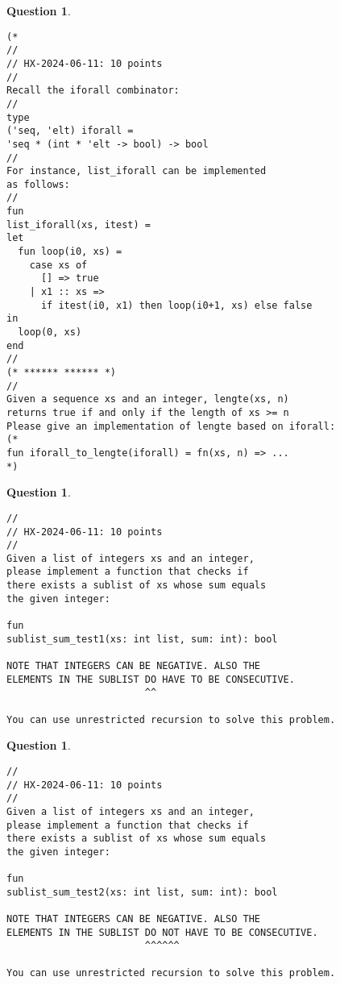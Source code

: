 \documentclass[12pt,fullpage]{article}
\newtheorem{question}[lemma]{Question}
\begin{document}
\vfill\newpage

\begin{question}~~
\begin{verbatim}
(*
//
// HX-2024-06-11: 10 points
//
Recall the iforall combinator:
//
type
('seq, 'elt) iforall =
'seq * (int * 'elt -> bool) -> bool
//
For instance, list_iforall can be implemented
as follows:
//
fun
list_iforall(xs, itest) =
let
  fun loop(i0, xs) =
    case xs of
      [] => true
    | x1 :: xs =>
      if itest(i0, x1) then loop(i0+1, xs) else false
in
  loop(0, xs)
end
//
(* ****** ****** *)
//
Given a sequence xs and an integer, lengte(xs, n)
returns true if and only if the length of xs >= n
Please give an implementation of lengte based on iforall:
(*
fun iforall_to_lengte(iforall) = fn(xs, n) => ...
*)
\end{verbatim}
\end{question}

\vfill\newpage

\begin{question}~~
\begin{verbatim}
//
// HX-2024-06-11: 10 points
//
Given a list of integers xs and an integer,
please implement a function that checks if
there exists a sublist of xs whose sum equals
the given integer:

fun
sublist_sum_test1(xs: int list, sum: int): bool

NOTE THAT INTEGERS CAN BE NEGATIVE. ALSO THE
ELEMENTS IN THE SUBLIST DO HAVE TO BE CONSECUTIVE.
                        ^^

You can use unrestricted recursion to solve this problem.
\end{verbatim}
\end{question}

\vfill\newpage

\begin{question}~~
\begin{verbatim}
//
// HX-2024-06-11: 10 points
//
Given a list of integers xs and an integer,
please implement a function that checks if
there exists a sublist of xs whose sum equals
the given integer:

fun
sublist_sum_test2(xs: int list, sum: int): bool

NOTE THAT INTEGERS CAN BE NEGATIVE. ALSO THE
ELEMENTS IN THE SUBLIST DO NOT HAVE TO BE CONSECUTIVE.
                        ^^^^^^

You can use unrestricted recursion to solve this problem.
\end{verbatim}
\end{question}
\end{document}
